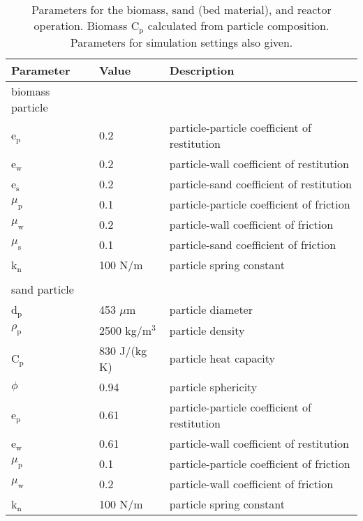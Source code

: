 \begin{table}[H]
    \centering
    \caption{Parameters for the biomass, sand (bed material), and reactor operation. Biomass C$_\text{p}$ calculated from particle composition. Parameters for simulation settings also given.}
    \label{tab:params}
    \begin{tabular}{lll}
        \toprule
        Parameter & Value & Description \\
        \midrule
        biomass particle \\
        e$_\text{p}$    & 0.2        & particle-particle coefficient of restitution \\
        e$_\text{w}$    & 0.2        & particle-wall coefficient of restitution \\
        e$_\text{s}$    & 0.2        & particle-sand coefficient of restitution \\
        $\mu_\text{p}$  & 0.1        & particle-particle coefficient of friction \\
        $\mu_\text{w}$  & 0.2        & particle-wall coefficient of friction \\
        $\mu_\text{s}$  & 0.1        & particle-sand coefficient of friction \\
        k$_\text{n}$    & 100 N/m    & particle spring constant \\
        \\
        sand particle \\
        d$_\text{p}$       & 453 $\mu$m          & particle diameter \\
        $\rho_\text{p}$    & 2500 kg/m$^3$       & particle density \\
        C$_\text{p}$       & 830 J/(kg\,K)      & particle heat capacity \\
        $\phi$             & 0.94                & particle sphericity \\
        e$_\text{p}$       & 0.61                & particle-particle coefficient of restitution \\
        e$_\text{w}$       & 0.61                & particle-wall coefficient of restitution \\
        $\mu_\text{p}$     & 0.1                 & particle-particle coefficient of friction \\
        $\mu_\text{w}$     & 0.2                 & particle-wall coefficient of friction \\
        k$_\text{n}$       & 100 N/m             & particle spring constant \\

\end{tabular}
\end{table}
